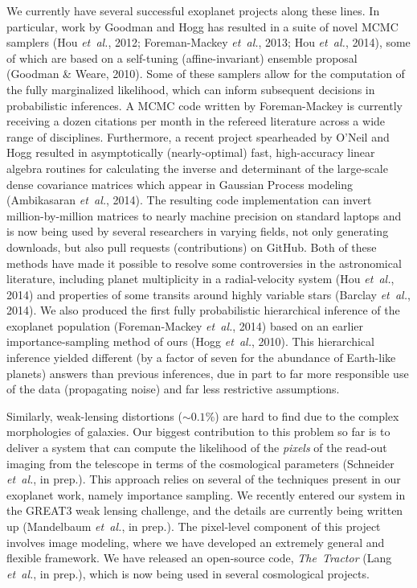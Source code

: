 \documentclass[12pt]{article}
\newcommand{\foreign}[1]{\textsl{#1}}
\newcommand{\etal}{\foreign{et~al.}}
\newcommand{\project}[1]{\textsl{#1}}
\begin{document}
We currently have several successful exoplanet projects along these
lines.
In particular, work by Goodman and Hogg has resulted in a suite of novel
MCMC samplers (Hou \etal, 2012; Foreman-Mackey \etal, 2013; Hou \etal,
2014), some of which are based on a self-tuning (affine-invariant)
ensemble proposal (Goodman \& Weare, 2010).
Some of these samplers allow for the computation of the fully
marginalized likelihood, which can inform subsequent decisions in
probabilistic inferences.
A MCMC code written by Foreman-Mackey is currently receiving a dozen
citations per month in the refereed literature across a wide range of
disciplines.
Furthermore, a recent project spearheaded by O'Neil and Hogg resulted in
asymptotically (nearly-optimal) fast, high-accuracy linear algebra
routines for calculating the inverse and determinant of the large-scale
dense covariance matrices which appear in Gaussian Process modeling
(Ambikasaran \etal, 2014).
The resulting code implementation can invert million-by-million matrices
to nearly machine precision on standard laptops and is now being used by
several researchers in varying fields, not only generating
downloads, but also pull requests (contributions) on GitHub.
Both of these methods have made it possible to resolve some
controversies in the astronomical literature, including planet
multiplicity in a radial-velocity system (Hou \etal, 2014) and
properties of some transits around highly variable stars (Barclay
\etal, 2014).
We also produced the first fully probabilistic hierarchical inference of
the exoplanet population (Foreman-Mackey \etal, 2014) based on an
earlier importance-sampling method of ours (Hogg \etal, 2010).
This hierarchical inference yielded different (by a factor of seven for
the abundance of Earth-like planets) answers than previous inferences,
due in part to far more responsible use of the data (propagating noise)
and far less restrictive assumptions.

Similarly, weak-lensing distortions ($\sim 0.1\%$) are hard to find
due to the complex morphologies of galaxies.
Our biggest contribution to this problem so far is to deliver a system
that can compute the likelihood of the \emph{pixels} of the read-out
imaging from the telescope in terms of the cosmological parameters
(Schneider \etal, in prep.).
This approach relies on several of the techniques present in our exoplanet
work, namely importance sampling.
We recently entered our system in the GREAT3 weak lensing challenge, and
the details are currently being written up (Mandelbaum \etal, in prep.).
The pixel-level component of this project involves image modeling,
where we have developed an extremely general and flexible framework.
We have released an open-source code, \project{The~Tractor} (Lang \etal,
in prep.), which is now being used in several cosmological projects.
\end{document}
